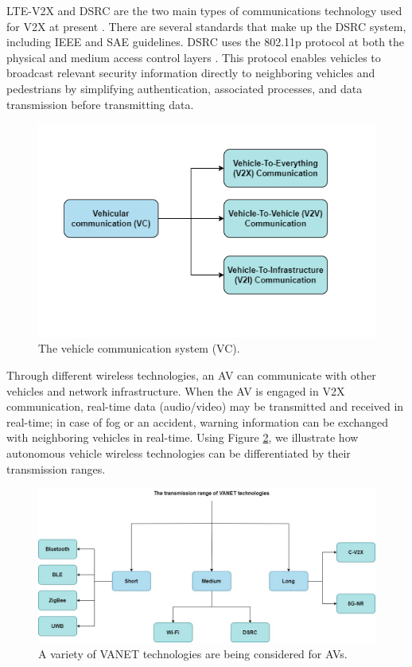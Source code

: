 \documentclass[a4paper,12pt]{article}
\begin{document}
\hspace{5mm} LTE-V2X and DSRC are the two main types of communications technology used for V2X at present \cite{article25}. There are several standards that make up the DSRC system, including IEEE and SAE guidelines. DSRC uses the 802.11p protocol at both the physical and medium access control layers \cite{article25}. This protocol enables vehicles to broadcast relevant security information directly to neighboring vehicles and pedestrians by simplifying authentication, associated processes, and data transmission before transmitting data.


\begin{figure}[H]
  \centering
  \includegraphics*[width=0.8\columnwidth]{img/VC}
  \caption{The vehicle communication system (VC).}   
  \label{fig:The vehicle communication system}
\end{figure}


\hspace{5mm} Through different wireless technologies, an AV can communicate with other vehicles and network infrastructure. When the AV is engaged in V2X communication, real-time data (audio/video) may be transmitted and received in real-time; in case of fog or an accident, warning information can be exchanged with neighboring vehicles in real-time. Using Figure \ref{fig:VANET technologies}, we illustrate how autonomous vehicle wireless technologies can be differentiated by their transmission ranges.

\begin{figure}[H]
  \centering
  \includegraphics*[width=1.1\columnwidth]{img/VANET technologies}
  \caption{A variety of VANET technologies are being considered for AVs.}   
  \label{fig:VANET technologies}
\end{figure}
\end{document}
